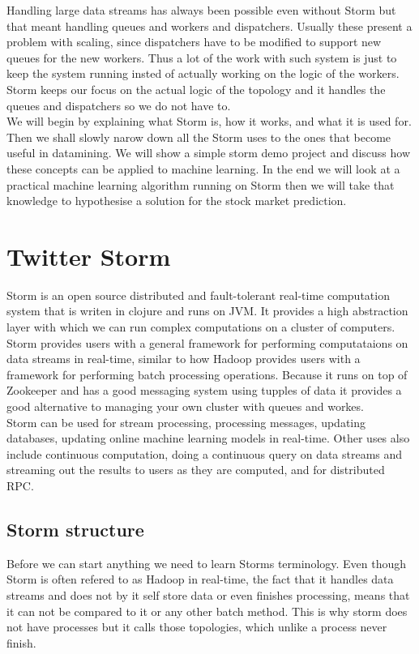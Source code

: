 \documentclass[journal]{IEEEtran/IEEEtran}
\begin{document}
Handling large data streams has always been possible even without Storm but that meant handling queues and workers and dispatchers. Usually these present a problem with scaling, since dispatchers have to be modified to support new queues for the new workers. Thus a lot of the work with such system is just to keep the system running insted of actually working on the logic of the workers. Storm keeps our focus on the actual logic of the topology and it handles the queues and dispatchers so we do not have to. \\

We will begin by explaining what Storm is, how it works, and what it is used for. Then we shall slowly narow down all the Storm uses to the ones that become useful in datamining. We will show a simple storm demo project and discuss how these concepts can be applied to machine learning. In the end we will look at a practical machine learning algorithm running on Storm then we will take that knowledge to hypothesise a solution for the stock market prediction.


\section{Twitter Storm}
Storm is an open source distributed and fault-tolerant real-time computation system that is writen in clojure and runs on JVM. It provides a high abstraction layer with which we can run complex computations on a cluster of computers. Storm provides users with a general framework for performing computataions on data streams in real-time, similar to how Hadoop provides users with a framework for performing batch processing operations. Because it runs on top of Zookeeper and has a good messaging system using tupples of data it provides a good alternative to managing your own cluster with queues and workes. \\

Storm can be used for stream processing, processing messages, updating databases, updating online machine learning models in real-time. Other uses also include continuous computation, doing a continuous query on data streams and streaming out the results to users as they are computed, and for distributed RPC. 


\subsection{Storm structure}
Before we can start anything we need to learn Storms terminology. Even though Storm is often refered to as Hadoop in real-time, the fact that it handles data streams and does not by it self store data or even finishes processing, means that it can not be compared to it or any other batch method. This is why storm does not have processes but it calls those topologies, which unlike a process never finish.\\
\end{document}
